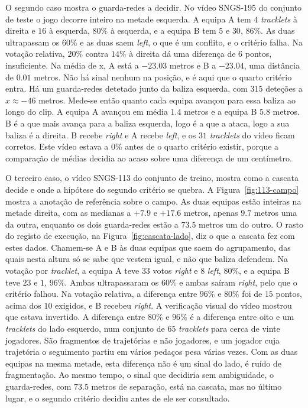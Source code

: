 O segundo caso mostra o guarda-redes a decidir. No vídeo SNGS-195 do conjunto de teste o jogo decorre inteiro na metade esquerda. A equipa A tem $4$ \emph{tracklets} à direita e $16$ à esquerda, $80\%$ à esquerda, e a equipa B tem $5$ e $30$, $86\%$. As duas ultrapassam os $60\%$ e as duas saem \emph{left}, o que é um conflito, e o critério falha. Na votação relativa, $20\%$ contra $14\%$ à direita dá uma diferença de $6$ pontos, insuficiente. Na média de x, A está a $-23.03$ metros e B a $-23.04$, uma distância de $0.01$ metros. Não há sinal nenhum na posição, e é aqui que o quarto critério entra. Há um guarda-redes detetado junto da baliza esquerda, com $315$ deteções a $x \approx -46$ metros. Mede-se então quanto cada equipa avançou para essa baliza ao longo do clip. A equipa A avançou em média $1.4$ metros e a equipa B $5.8$ metros. B é a que mais avança para a baliza esquerda, logo é a que a ataca, logo a sua baliza é a direita. B recebe \emph{right} e A recebe \emph{left}, e os $31$ \emph{tracklets} do vídeo ficam corretos. Este vídeo estava a $0\%$ antes de o quarto critério existir, porque a comparação de médias decidia ao acaso sobre uma diferença de um centímetro.

O terceiro caso, o vídeo SNGS-113 do conjunto de treino, mostra como a cascata decide e onde a hipótese do segundo critério se quebra. A Figura~\ref{fig:113-campo} mostra a anotação de referência sobre o campo. As duas equipas estão inteiras na metade direita, com as medianas a $+7.9$ e $+17.6$ metros, apenas $9.7$ metros uma da outra, enquanto os dois guarda-redes estão a $73.5$ metros um do outro. O rasto do registo de execução, na Figura~\ref{fig:cascata-lado}, diz o que a cascata fez com estes dados. Chamem-se A e B às duas equipas que saem do agrupamento, das quais nesta altura só se sabe que vestem igual, e não que baliza defendem. Na votação por \emph{tracklet}, a equipa A teve $33$ votos \emph{right} e $8$ \emph{left}, $80\%$, e a equipa B teve $23$ e $1$, $96\%$. Ambas ultrapassaram os $60\%$ e ambas saíram \emph{right}, pelo que o critério falhou. Na votação relativa, a diferença entre $96\%$ e $80\%$ foi de $15$ pontos, acima dos $10$ exigidos, e B recebeu \emph{right}. A verificação visual do vídeo mostrou que estava invertido. A diferença entre $80\%$ e $96\%$ é a diferença entre oito e um \emph{tracklets} do lado esquerdo, num conjunto de $65$ \emph{tracklets} para cerca de vinte jogadores. São fragmentos de trajetórias e não jogadores, e um jogador cuja trajetória o seguimento partiu em vários pedaços pesa várias vezes. Com as duas equipas na mesma metade, esta diferença não é um sinal do lado, é ruído de fragmentação. Ao mesmo tempo, o sinal que decidiria sem ambiguidade, o guarda-redes, com $73.5$ metros de separação, está na cascata, mas no último lugar, e o segundo critério decidiu antes de ele ser consultado.

